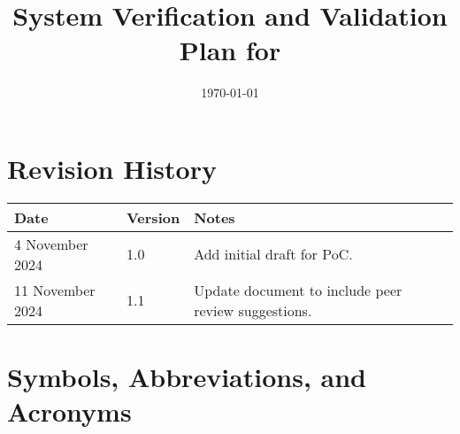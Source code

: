 \documentclass[12pt, titlepage]{article}
\begin{document}
\title{System Verification and Validation Plan for \progname{}} 
\author{\authname}
\date{\today}
	
\maketitle


\section*{Revision History}

\begin{tabularx}{\textwidth}{p{4cm}p{1.5cm}X} \toprule {\bf Date} & {\bf Version}
& {\bf Notes}\\
\midrule
4 November 2024 & 1.0 & Add initial draft for PoC.\\
11 November 2024 & 1.1 & Update document to include peer review suggestions.\\
\bottomrule
\end{tabularx}

\newpage

\tableofcontents

\listoftables

\newpage

\section{Symbols, Abbreviations, and Acronyms}
\end{document}
